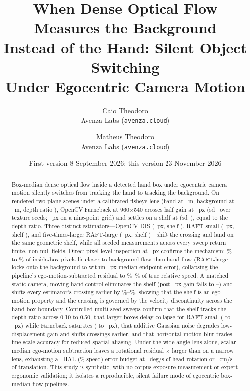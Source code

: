 \documentclass[11pt]{article}
\title{When Dense Optical Flow Measures the Background\\
Instead of the Hand: Silent Object Switching\\
Under Egocentric Camera Motion}
\author{Caio Theodoro\\ \small Avenza Labs (\texttt{avenza.cloud}) \and Matheus Theodoro\\ \small Avenza Labs (\texttt{avenza.cloud})}
\date{First version 8 September 2026; this version 23 November 2026}
\begin{document}
\maketitle

\begin{abstract}
\noindent
Box-median dense optical flow inside a detected hand box under egocentric camera motion silently
switches from tracking the hand to tracking the background. On rendered two-plane scenes under a
calibrated fisheye lens (hand at \cgHandDist{}~m, background at \cgBgDist{}~m, depth ratio
\cgRatio{}), OpenCV Farneback at 960$\times$540 crosses half gain at \cgHalfFineMean{}~px
(sd~\cgHalfFineSd{} over \cgNSeeds{} texture seeds; \cgWidthHalfB{}~px on a nine-point grid) and
settles on a shelf at \cgShelfMean{} (sd~\cgShelfSd{}), equal to the depth ratio. Three distinct
estimators---OpenCV DIS (\cgHalfDisMean{}~px, shelf \cgShelfDisMean{}), RAFT-small
(\cgHalfRaftMean{}~px, shelf \cgShelfRaftMean{}), and five-times-larger RAFT-large
(\cgHalfRaftLargeMean{}~px, shelf \cgShelfRaftLargeMean{})---shift the crossing and land on the
same geometric shelf, while all \cgTotalMeasurements{} seeded measurements across every sweep
return finite, non-null fields. Direct pixel-level inspection at \cgDispShelfProbe{}~px confirms
the mechanism: \cgFieldCloserBgMin{}\% to \cgFieldCloserBgMax{}\% of inside-box pixels lie closer
to background flow than hand flow (RAFT-large locks onto the background to within
\cgFieldRaftLEpeBg{}~px median endpoint error), collapsing the pipeline's ego-motion-subtracted
residual to \cgFieldRecMinPct{}\%--\cgFieldRecMaxPct{}\% of true relative speed. A matched
static-camera, moving-hand control eliminates the \cgRatio{} shelf (post-\cgDispShelfProbe{}~px
gain falls to \cgStaticFloorRaftL{}--\cgStaticFloorDis{}) and shifts every estimator's crossing
earlier by \cgShiftPctRaftS{}\%--\cgShiftPctRaftL{}\%, showing that the shelf is an ego-motion
property and the crossing is governed by the velocity discontinuity across the hand-box boundary.
Controlled multi-seed sweeps confirm that the shelf tracks the depth ratio across 0.10 to 0.50,
that larger boxes delay collapse for RAFT-small (\cgBoxHalfRaftSmall{} to
\cgBoxHalfRaftLarge{}~px) while Farneback saturates (\cgBoxHalfFarSmall{} to
\cgBoxHalfFarLarge{}~px), that additive Gaussian noise degrades low-displacement gain and shifts
crossings earlier, and that horizontal motion blur trades fine-scale accuracy for reduced spatial
aliasing. Under the wide-angle lens alone, scalar-median ego-motion subtraction leaves a
rotational residual \cgRotRatio{}$\times$ larger than on a narrow lens, exhausting a
\cgHalBound{}~HAL (\cgBudgetPct{}\% speed) error budget at \cgRotBudget{}~deg/s of head rotation
or \cgTransBudgetCm{}~cm/s of translation. This study is synthetic, with no corpus exposure
measurement or expert ergonomic validation; it isolates a reproducible, silent failure mode of
egocentric box-median flow pipelines.
\end{abstract}
\end{document}
